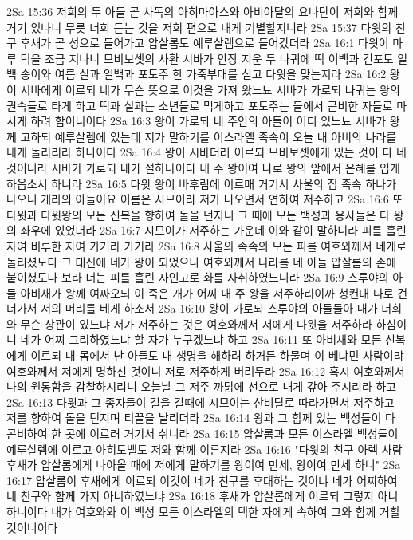 2Sa 15:36  저희의 두 아들 곧 사독의 아히마아스와 아비아달의 요나단이 저희와 함께 거기 있나니 무릇 너희 듣는 것을 저희 편으로 내게 기별할지니라
2Sa 15:37  다윗의 친구 후새가 곧 성으로 들어가고 압살롬도 예루살렘으로 들어갔더라
2Sa 16:1  다윗이 마루 턱을 조금 지나니 므비보셋의 사환 시바가 안장 지운 두 나귀에 떡 이백과 건포도 일백 송이와 여름 실과 일백과 포도주 한 가죽부대를 싣고 다윗을 맞는지라
2Sa 16:2  왕이 시바에게 이르되 네가 무슨 뜻으로 이것을 가져 왔느뇨 시바가 가로되 나귀는 왕의 권속들로 타게 하고 떡과 실과는 소년들로 먹게하고 포도주는 들에서 곤비한 자들로 마시게 하려 함이니이다
2Sa 16:3  왕이 가로되 네 주인의 아들이 어디 있느뇨 시바가 왕께 고하되 예루살렘에 있는데 저가 말하기를 이스라엘 족속이 오늘 내 아비의 나라를 내게 돌리리라 하나이다
2Sa 16:4  왕이 시바더러 이르되 므비보셋에게 있는 것이 다 네 것이니라 시바가 가로되 내가 절하나이다 내 주 왕이여 나로 왕의 앞에서 은혜를 입게 하옵소서 하니라
2Sa 16:5  다윗 왕이 바후림에 이르매 거기서 사울의 집 족속 하나가 나오니 게라의 아들이요 이름은 시므이라 저가 나오면서 연하여 저주하고
2Sa 16:6  또 다윗과 다윗왕의 모든 신복을 향하여 돌을 던지니 그 때에 모든 백성과 용사들은 다 왕의 좌우에 있었더라
2Sa 16:7  시므이가 저주하는 가운데 이와 같이 말하니라 피를 흘린 자여 비루한 자여 가거라 가거라
2Sa 16:8  사울의 족속의 모든 피를 여호와께서 네게로 돌리셨도다 그 대신에 네가 왕이 되었으나 여호와께서 나라를 네 아들 압살롬의 손에 붙이셨도다 보라 너는 피를 흘린 자인고로 화를 자취하였느니라
2Sa 16:9  스루야의 아들 아비새가 왕께 여짜오되 이 죽은 개가 어찌 내 주 왕을 저주하리이까 청컨대 나로 건너가서 저의 머리를 베게 하소서
2Sa 16:10  왕이 가로되 스루야의 아들들아 내가 너희와 무슨 상관이 있느냐 저가 저주하는 것은 여호와께서 저에게 다윗을 저주하라 하심이니 네가 어찌 그리하였느냐 할 자가 누구겠느냐 하고
2Sa 16:11  또 아비새와 모든 신복에게 이르되 내 몸에서 난 아들도 내 생명을 해하려 하거든 하물며 이 베냐민 사람이랴 여호와께서 저에게 명하신 것이니 저로 저주하게 버려두라
2Sa 16:12  혹시 여호와께서 나의 원통함을 감찰하시리니 오늘날 그 저주 까닭에 선으로 내게 갚아 주시리라 하고
2Sa 16:13  다윗과 그 종자들이 길을 갈때에 시므이는 산비탈로 따라가면서 저주하고 저를 향하여 돌을 던지며 티끌을 날리더라
2Sa 16:14  왕과 그 함께 있는 백성들이 다 곤비하여 한 곳에 이르러 거기서 쉬니라
2Sa 16:15  압살롬과 모든 이스라엘 백성들이 예루살렘에 이르고 아히도벨도 저와 함께 이른지라
2Sa 16:16  "다윗의 친구 아렉 사람 후새가 압살롬에게 나아올 때에 저에게 말하기를 왕이여 만세, 왕이여 만세 하니"
2Sa 16:17  압살롬이 후새에게 이르되 이것이 네가 친구를 후대하는 것이냐 네가 어찌하여 네 친구와 함께 가지 아니하였느냐
2Sa 16:18  후새가 압살롬에게 이르되 그렇지 아니하니이다 내가 여호와와 이 백성 모든 이스라엘의 택한 자에게 속하여 그와 함께 거할 것이니이다

